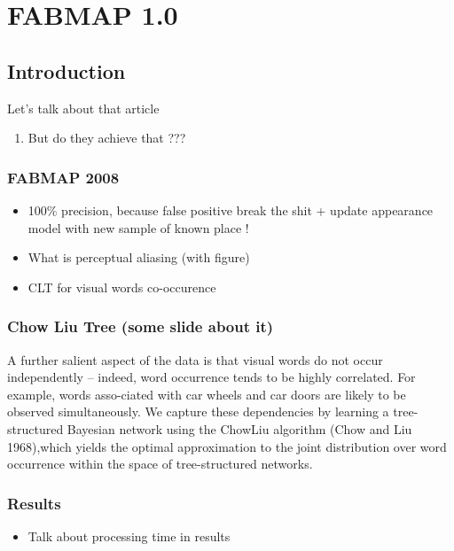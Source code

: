 \section{FABMAP 1.0}

\subsection{Introduction}
\begin{frame}{Let's talk about that article}
   \begin{enumerate}
       \item But do they achieve that ???
   \end{enumerate} 
\end{frame}


\begin{frame}
    \frametitle{FABMAP 2008}
    \begin{itemize}
        \item 100\% precision, because false positive break the shit + update appearance model with new sample of known place !
        \item What is perceptual aliasing (with figure)
        \item CLT for visual words co-occurence
    \end{itemize}
\end{frame}

\begin{frame}
    \frametitle{Chow Liu Tree (some slide about it)}
    A further salient aspect of the data is that visual words do not occur independently – indeed, word occurrence tends to be highly correlated. For example, words asso-ciated with car wheels and car doors are likely to be observed simultaneously. We capture these dependencies by learning a tree-structured Bayesian network using the ChowLiu algorithm (Chow and Liu 1968),which yields the optimal approximation to the joint distribution over word occurrence within the space of tree-structured networks.
\end{frame}

\begin{frame}
    \frametitle{Results}
    \begin{itemize}
        \item Talk about processing time in results
    \end{itemize}
\end{frame}
